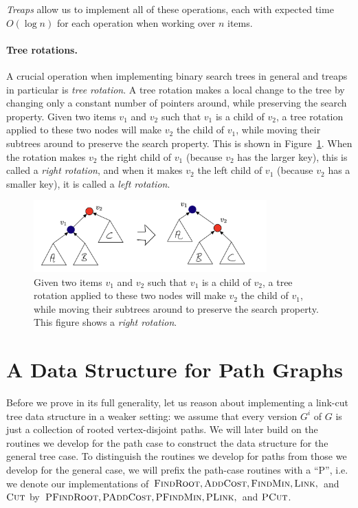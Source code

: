 \emph{Treaps} allow us to implement all of these operations, each with expected time $O(\log n)$ for each operation when working over $n$ items. 


\paragraph{Tree rotations.} A crucial operation when implementing binary search trees in general and treaps in particular is \emph{tree rotation}. A tree rotation makes a local change to the tree by changing only a constant number of pointers around, while preserving the search property.
Given two items $v_1$ and $v_2$ such that $v_1$ is a child of $v_2$, a tree rotation applied to these two nodes will make $v_2$ the child of $v_1$, while moving their subtrees around to preserve the search property. This is shown in Figure~\ref{fig:binaryTreeRotation}.
When the rotation makes $v_2$ the right child of $v_1$ (because $v_2$ has the larger key), this is called a \emph{right rotation}, and when it makes $v_2$ the left child of $v_1$ (because $v_2$ has a smaller key), it is called a \emph{left rotation}.

\begin{figure}[ht]
    \centering
    \includegraphics[width=0.8\textwidth]{./fig/TreeRotation_lectureDynamicTree.png}
    \caption{Given two items $v_1$ and $v_2$ such that $v_1$ is a child of $v_2$, a tree rotation applied to these two nodes will make $v_2$ the child of $v_1$, while moving their subtrees around to preserve the search property. This figure shows a \emph{right rotation}.}
    \label{fig:binaryTreeRotation}
  \end{figure}



\section{A Data Structure for Path Graphs}

Before we prove  in its full generality, let us reason about implementing a link-cut tree data structure in a weaker setting: we assume that every version $G^i$ of $G$ is just a collection of rooted vertex-disjoint paths.
We will later build on the routines we develop for the path case to construct the data structure for the general tree case.
To distinguish the routines we develop for paths from those we develop for the general case, we will prefix the path-case routines with a ``P'', i.e. we denote our implementations of $\textsc{FindRoot}, \textsc{AddCost}, \textsc{FindMin}, \textsc{Link},$ and $\textsc{Cut}$ by $\textsc{PFindRoot}, \textsc{PAddCost}, \textsc{PFindMin}, \textsc{PLink},$ and $\textsc{PCut}$.


